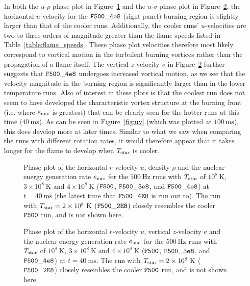 \documentclass[preprint,times,tighten]{aastex63}
\begin{document}
In both the $u$-$\rho$ phase plot in Figure~\ref{fig:urho_hot} and the $u$-$v$ phase plot in Figure~\ref{fig:uv_hot}, the horizontal $u$-velocity for the $\tt{F500\_4e8}$ (right panel) burning region is slightly larger than that of the cooler runs. Additionally, the cooler runs' $u$-velocities are two to three orders of magnitude greater than the flame speeds listed in Table~\ref{table:flame_speeds}. These phase plot velocities therefore most likely correspond to vortical motion in the turbulent burning vortices rather than the propagation of a flame itself. The vertical $z$-velocity $v$ in Figure~\ref{fig:uv_hot} further suggests that $\tt{F500\_4e8}$ undergoes increased vortical motion, as we see that the velocity magnitude in the burning region is significantly larger than in the lower temperature runs. Also of interest in these plots is that the coolest run does not seem to have developed the characteristic vortex structure at the burning front (i.e. where $\dot{e}_{\rm nuc}$ is greatest) that can be clearly seen for the hotter runs at this time ($40~\mathrm{ms}$). As can be seen in Figure~\ref{fig:uv} (which was plotted at $100~\mathrm{ms}$), this does develop more at later times. Similar to what we saw when comparing the runs with different rotation rates, it would therefore appear that it takes longer for the flame to develop when $T_{\rm star}$ is cooler. 

\begin{figure}[t]
    \centering
    \caption{\label{fig:urho_hot}Phase plot of the horizontal $r$-velocity $u$, density $\rho$ and the nuclear energy generation rate $\dot{e}_{\rm nuc}$ for the $500~\mathrm{Hz}$ runs with $T_{\rm star}$ of $10^8~\mathrm{K}$, $3\times10^8~\mathrm{K}$ and $4\times10^8~\mathrm{K}$ ($\tt{F500}$, $\tt{F500\_3e8}$, and $\tt{F500\_4e8}$) at $t = 40~\mathrm{ms}$ (the latest time that $\tt{F500\_4E8}$ is run out to). The run with $T_{\rm star} = 2\times10^8~\mathrm{K}$ ($\tt{F500\_2E8}$) closely resembles the cooler $\tt{F500}$ run, and is not shown here.}
\end{figure}

\begin{figure}[t]
    \centering
    \caption{\label{fig:uv_hot}Phase plot of the horizontal $r$-velocity $u$, vertical $z$-velocity $v$ and the nuclear energy generation rate $\dot{e}_{\rm nuc}$ for the $500~\mathrm{Hz}$ runs with $T_{\rm star}$ of $10^8~\mathrm{K}$, $3\times10^8~\mathrm{K}$ and $4\times10^8~\mathrm{K}$ ($\tt{F500}$, $\tt{F500\_3e8}$, and $\tt{F500\_4e8}$) at $t = 40~\mathrm{ms}$. The run with $T_{\rm star} = 2\times10^8~\mathrm{K}$ ($\tt{F500\_2E8}$) closely resembles the cooler $\tt{F500}$ run, and is not shown here.}
\end{figure}
\end{document}
